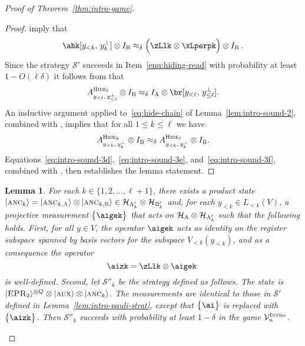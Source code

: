 \documentclass[11pt]{article}
\newtheorem{lemma}[theorem]{Lemma}
\theoremstyle{definition}
\newcommand{\ket}[1]{|#1\rangle}
\newcommand{\Id}{\ensuremath{I}}
\newcommand{\mH}{\ensuremath{\mathcal{H}}}
\newcommand{\ia}{\Id_\alice}
\newcommand{\ib}{\Id_\bob}
\newcommand{\verifier}{\mathcal{V}}
\newcommand{\strategy}{\mathscr{S}}
\newcommand{\gamestyle}[1]{\ensuremath{\textsc{#1}}\xspace}
\newcommand{\intro}{\gamestyle{Intro}}
\newcommand{\labelstyle}[1]{\ensuremath{\textsc{#1}}\xspace}
\newcommand{\EPR}{\labelstyle{EPR}}
\newcommand{\aux}{\labelstyle{aux}}
\newcommand{\ancilla}{\labelstyle{anc}}
\newcommand{\alice}{\labelstyle{A}}
\newcommand{\bob}{\labelstyle{B}}
\newcommand{\typestyle}[1]{\ensuremath{\textsc{#1}}\xspace}
\newcommand{\Hide}[1]{\typestyle{Hide}_{#1}}
\begin{document}
\begin{proof}[Proof of Theorem~\ref{thm:intro-game}]
  \begin{proof}
     imply that
    \begin{equation}\label{eq:intro-sound-3d}
      \ahk[y_{<k},\, y^\perp_k] \otimes \ib \approx_\delta
      \Bigl( \zLlk \otimes \xLperpk \Bigr) \otimes \ib\:.
    \end{equation}
    Since the strategy $\strategy'$ succeeds in Item~\ref{enu:hiding-read} with
    probability at least $1 - O(\ell \delta)$ it follows from
     that
    \begin{equation}\label{eq:intro-sound-3e}
      A^{\Hide{\ell}}_{y_{<\ell},\, y^\perp_{\leq \ell}} \otimes \ib
      \approx_\delta \ia \otimes \br[y_{<\ell},\, y^\perp_{\leq
          \ell}].
    \end{equation}
    An inductive argument applied to~\eqref{eq:hide-chain} of
    Lemma~\ref{lem:intro-sound-2}, combined with ,
    implies that for all $1 \leq k \leq \ell$ we have
    \begin{equation}\label{eq:intro-sound-3f}
      A^{\Hide{k}}_{y_{<k},\, y^\perp_{k}} \otimes \ib \approx_\delta A^{\Hide{
          \ell}}_{y_{<k},\, y^\perp_{k}} \otimes \ib.
    \end{equation}
    Equations~\eqref{eq:intro-sound-3d},~\eqref{eq:intro-sound-3e},
    and~\eqref{eq:intro-sound-3f}, combined with ,
    then establishes the lemma statement.
  \end{proof}

  \begin{lemma}
    \label{lem:intro-sound-induction}
    For each $k\in \{1, 2, \ldots, \ell+1\}$, there exists a product state
    $\ket{\ancilla_k} = \ket{\ancilla_{k,\alice}} \otimes
    \ket{\ancilla_{k,\bob}} \in \mH_{\alice'_k} \otimes \mH_{\bob'_k}$ and, for
    each $y_{<k} \in L_{<k}(V)$, a projective measurement $\bigl\{\aigek
    \bigr\}$ that acts on $\mH_{\alice} \otimes \mH_{\alice'_k}$ such that the
    following holds.
		First, for all $y \in V$, the operator $\aigek$ acts as identity on the
    register subspace spanned by basis vectors for the subspace $V_{<
      k}(y_{<k})$, and as a consequence the operator
    \begin{equation}\label{eq:intro-sound-4aa}
      \aizk = \zLlk \otimes \aigek\;
    \end{equation}
    is well-defined.
    Second, let $\strategy''_k$ be the strategy defined as follows.
    The state is $\ket{\EPR_2}^{\otimes Q} \otimes \ket{\aux} \otimes
    \ket{\ancilla_k}$.
    The measurements are identical to those in $\strategy'$ defined in
    Lemma~\ref{lem:intro-pauli-strat}, except that $\bigl\{ \ai \bigr\}$ is
    replaced with $\bigl\{ \aizk \bigr\}$.
    Then $\strategy''_k$ succeeds with probability at least $1-\delta$ in the
    game $\verifier_n^\intro$.
  \end{lemma}
  

\end{proof}
\end{document}
